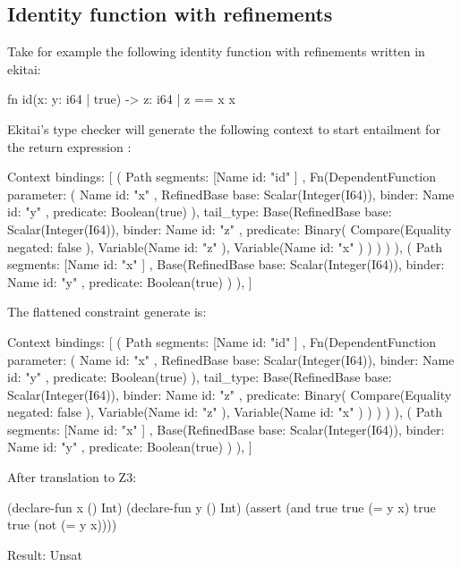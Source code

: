 \documentclass[
  oneside,
  english,
  coorientadorbanca,
  noabntexcite
]{ufsc-thesis-rn46-2019}
\newcommand{\code}[1]{\text{\scpfamily\setlength\spaceskip{0.35em}#1}}
\begin{document}
\subsection{Identity function with refinements}

Take for example the following identity function with refinements written in ekitai:

\begin{rustcode}
fn id(x: {y: i64 | true}) -> {z: i64 | z == x} {
  x
}
\end{rustcode}

Ekitai's type checker will generate the following context to start entailment for the return expression \code{x}:

\begin{rustcode}
Context { bindings: [
  ( Path { segments: [Name { id: "id" }] },
    Fn(DependentFunction { 
      parameter: (
        Name { id: "x" },
        RefinedBase { base: Scalar(Integer(I64)), binder: Name { id: "y" }, predicate: Boolean(true) }
      ),
      tail_type: Base(RefinedBase {
        base: Scalar(Integer(I64)), binder: Name { id: "z" },
        predicate: Binary(
          Compare(Equality { negated: false }), Variable(Name { id: "z" }), Variable(Name { id: "x" })
        ) 
      }) 
    })
  ), 
  ( Path { segments: [Name { id: "x" }] },
    Base(RefinedBase { base: Scalar(Integer(I64)), binder: Name { id: "y" }, predicate: Boolean(true) })
  ),
] } 
\end{rustcode}

The flattened constraint generate is:

\begin{rustcode}
Context { bindings: [
  ( Path { segments: [Name { id: "id" }] },
    Fn(DependentFunction { 
      parameter: (
        Name { id: "x" },
        RefinedBase { base: Scalar(Integer(I64)), binder: Name { id: "y" }, predicate: Boolean(true) }
      ),
      tail_type: Base(RefinedBase {
        base: Scalar(Integer(I64)), binder: Name { id: "z" },
        predicate: Binary(
          Compare(Equality { negated: false }), Variable(Name { id: "z" }), Variable(Name { id: "x" })
        ) 
      }) 
    })
  ), 
  ( Path { segments: [Name { id: "x" }] },
    Base(RefinedBase { base: Scalar(Integer(I64)), binder: Name { id: "y" }, predicate: Boolean(true) })
  ),
] }
\end{rustcode}

After translation to Z3:

\begin{rustcode}
(declare-fun x () Int)
(declare-fun y () Int)
(assert (and true true (= y x) true true (not (= y x))))

Result: Unsat
\end{rustcode}
\end{document}
